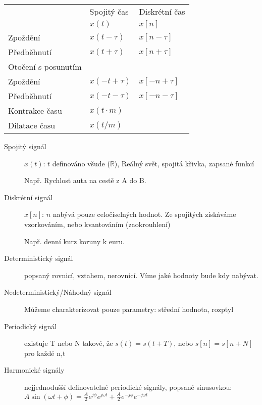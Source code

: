 \documentclass[a4paper, 11pt]{report}
\begin{document}
\begin{tabular}{l l l}
			& Spojitý čas 	& Diskrétní čas \\
			& $x(t)$ 		& $x[n]$ \\
Zpoždění 	& $x(t - \tau)$	& $x[n - \tau]$ \\
Předběhnutí	& $x(t + \tau)$	& $x[n + \tau]$ \\
Otočení s posunutím & & \\
Zpoždění 	& $x( - t + \tau)$	& $x[ - n + \tau]$ \\
Předběhnutí	& $x( - t - \tau)$	& $x[ - n - \tau]$ \\

Kontrakce času	& $x(t \cdot m)$& \\
Dilatace času	& $x(t / m)$	&	\\
\end{tabular}

\begin{description}	
	\item[Spojitý signál] $x(t)$: $t$ definováno všude ($\mathbb{R}$), Reálný svět, spojitá křivka, zapsané funkcí
	
	Např. Rychlost auta na cestě z A do B.
	
	\item[Diskrétní signál] $x[n]$: $n$ nabývá pouze celočíselných hodnot. Ze spojitých získáváme vzorkováním, nebo kvantováním (zaokrouhlení)
	
	Např. denní kurz koruny k euru.
\end{description}

\begin{description}
	\item[Deterministický signál] popsaný rovnicí, vztahem, nerovnicí. Víme jaké hodnoty bude kdy nabývat.
	\item[Nedeterministický/Náhodný signál] Můžeme charakterizovat pouze parametry: střední hodnota, rozptyl
\end{description}

\begin{description}
	\item[Periodický signál] existuje T nebo N takové, že $s(t) = s(t+T)$, nebo $s[n] = s[n+N]$ pro každé n,t
	\item[Harmonické signály] nejjednodušší definovatelné periodické signály, popsané sinusovkou: $A \sin(\omega t + \phi) = \frac{A}{2} e^{j \phi} e^{j \omega t} + \frac{A}{2} e^{- j \phi} e^{ - j \omega t}$
\end{description}
\end{document}

